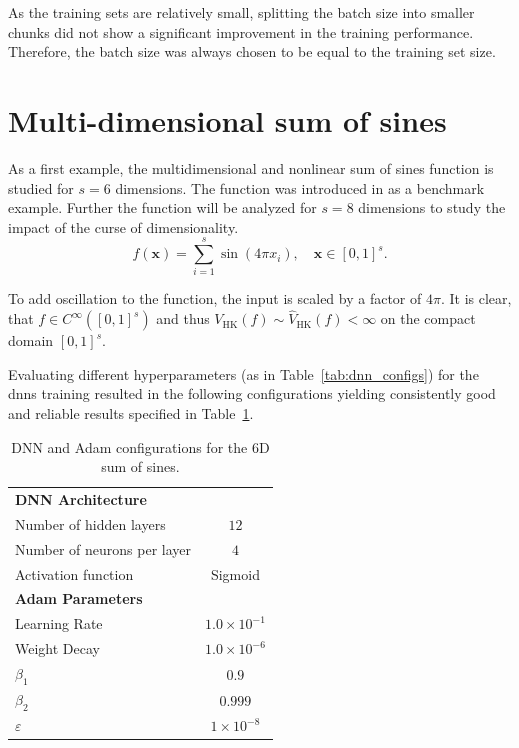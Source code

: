 As the training sets are relatively small, splitting the batch size into smaller
chunks did not show a significant improvement in the training performance.
Therefore, the batch size was always chosen to be equal to the training set
size.

\section{Multi-dimensional sum of sines}

As a first example, the multidimensional and nonlinear sum of sines function is
studied for $s = 6$ dimensions. The function was introduced in
\cite{lye2020deep} as a benchmark example. Further the function will be analyzed
for $s=8$ dimensions to study the impact of the curse of dimensionality.
\begin{equation}
    \label{eq:sum_of_sines}
    f(\mathbf{x}) = \sum_{i=1}^{s} \sin( 4\pi x_i), \quad \mathbf{x} \in [0,1]^s.
\end{equation}

To add oscillation to the function, the input is scaled by a factor of $4\pi$.
It is clear, that $f\in C^\infty([0,1]^s)$ and thus
$V_\mathrm{HK}(f)\sim\hat{V}_\mathrm{HK}(f)<\infty$ on the compact domain
$[0,1]^s$.

Evaluating different hyperparameters (as in Table~\ref{tab:dnn_configs}) for the
\acp{dnn} training resulted in the following configurations yielding
consistently good and reliable results specified in
Table~\ref{tab:sum_of_sines6d_dnn_adam}.

\begin{table}[H]
\begin{tabular}{lc}
\toprule
\textbf{DNN Architecture} & \\
Number of hidden layers & $12$ \\
Number of neurons per layer & $4$ \\
Activation function & Sigmoid \\
\midrule
\textbf{Adam Parameters} & \\
Learning Rate & $1.0 \times 10^{-1}$ \\
Weight Decay & $1.0 \times 10^{-6}$ \\
$\beta_1$ & $0.9$ \\
$\beta_2$ & $0.999$ \\
$\varepsilon$ & $1 \times 10^{-8}$ \\
\bottomrule
\end{tabular}
\centering
\caption{DNN and Adam configurations for the 6D sum of sines.}
\label{tab:sum_of_sines6d_dnn_adam}
\end{table}

